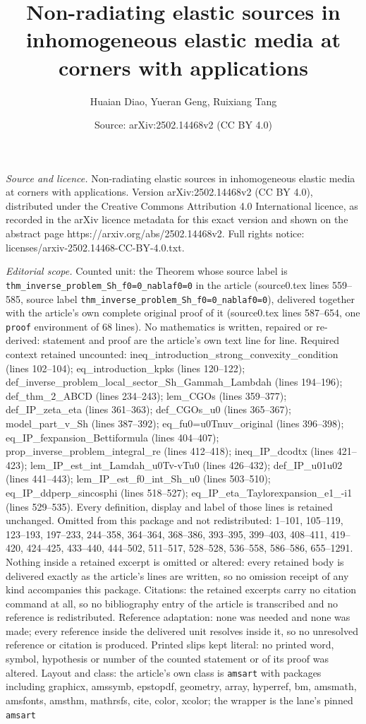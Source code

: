 \documentclass[10pt,a4paper]{amsart}
\title[Non-radiating elastic sources in inhomogeneous elastic media]{Non-radiating elastic sources in inhomogeneous elastic media at corners with applications}
\author{Huaian Diao, Yueran Geng, Ruixiang Tang}
\date{Source: arXiv:2502.14468v2 (CC BY 4.0)}
\begin{document}
\maketitle

\noindent\emph{Source and licence.} Non-radiating elastic sources in inhomogeneous elastic media at corners with applications. Version arXiv:2502.14468v2 (CC BY 4.0), distributed under the Creative Commons Attribution 4.0 International licence, as recorded in the arXiv licence metadata for this exact version and shown on the abstract page https://arxiv.org/abs/2502.14468v2. Full rights notice: licenses/arxiv-2502.14468-CC-BY-4.0.txt.\par\smallskip

\noindent\textit{Editorial scope.} Counted unit: the Theorem whose source label is \texttt{thm\_inverse\_problem\_Sh\_f0=0\_nablaf0=0} in the article (source0.tex lines 559--585, source label \texttt{thm\_inverse\_problem\_Sh\_f0=0\_nablaf0=0}), delivered together with the article's own complete original proof of it (source0.tex lines 587--654, one \texttt{proof} environment of 68 lines). No mathematics is written, repaired or re-derived: statement and proof are the article's own text line for line. Required context retained uncounted: ineq\_introduction\_strong\_convexity\_condition (lines 102--104); eq\_introduction\_kpks (lines 120--122); def\_inverse\_problem\_local\_sector\_Sh\_Gammah\_Lambdah (lines 194--196); def\_thm\_2\_ABCD (lines 234--243); lem\_CGOs (lines 359--377); def\_IP\_zeta\_eta (lines 361--363); def\_CGOs\_u0 (lines 365--367); model\_part\_v\_Sh (lines 387--392); eq\_fu0=u0Tnuv\_original (lines 396--398); eq\_IP\_fexpansion\_Bettiformula (lines 404--407); prop\_inverse\_problem\_integral\_re (lines 412--418); ineq\_IP\_dcodtx (lines 421--423); lem\_IP\_est\_int\_Lamdah\_u0Tv-vTu0 (lines 426--432); def\_IP\_u01u02 (lines 441--443); lem\_IP\_est\_f0\_int\_Sh\_u0 (lines 503--510); eq\_IP\_ddperp\_sincosphi (lines 518--527); eq\_IP\_eta\_Taylorexpansion\_e1\_-i1 (lines 529--535). Every definition, display and label of those lines is retained unchanged. Omitted from this package and not redistributed: 1--101, 105--119, 123--193, 197--233, 244--358, 364--364, 368--386, 393--395, 399--403, 408--411, 419--420, 424--425, 433--440, 444--502, 511--517, 528--528, 536--558, 586--586, 655--1291. Nothing inside a retained excerpt is omitted or altered: every retained body is delivered exactly as the article's lines are written, so no omission receipt of any kind accompanies this package. Citations: the retained excerpts carry no citation command at all, so no bibliography entry of the article is transcribed and no reference is redistributed. Reference adaptation: none was needed and none was made; every reference inside the delivered unit resolves inside it, so no unresolved reference or citation is produced. Printed slips kept literal: no printed word, symbol, hypothesis or number of the counted statement or of its proof was altered. Layout and class: the article's own class is \texttt{amsart} with packages including graphicx, amssymb, epstopdf, geometry, array, hyperref, bm, amsmath, amsfonts, amsthm, mathrsfs, cite, color, xcolor; the wrapper is the lane's pinned \texttt{amsart} 
\end{document}

